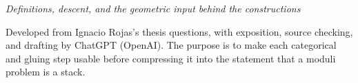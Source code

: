 \documentclass[12pt,oneside]{memoir}
\author{Ignacio Rojas\\[0.4ex]ChatGPT (OpenAI)}
\begin{document}
\maketitle
\begin{center}
\emph{Definitions, descent, and the geometric input behind the constructions}
\par\bigskip
\begin{minipage}{0.82\textwidth}
\small\centering
Developed from Ignacio Rojas's thesis questions, with exposition,
source checking, and drafting by ChatGPT (OpenAI).
The purpose is to make each categorical and gluing step usable before
compressing it into the statement that a moduli problem is a stack.
\end{minipage}
\end{center}
\clearpage
\tableofcontents*
\clearpage



\appendix




\end{document}
